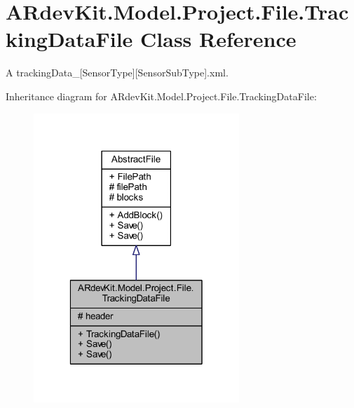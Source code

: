 \hypertarget{class_a_rdev_kit_1_1_model_1_1_project_1_1_file_1_1_tracking_data_file}{\section{A\-Rdev\-Kit.\-Model.\-Project.\-File.\-Tracking\-Data\-File Class Reference}
\label{class_a_rdev_kit_1_1_model_1_1_project_1_1_file_1_1_tracking_data_file}
}


A tracking\-Data\-\_\-\mbox{[}Sensor\-Type\mbox{]}\mbox{[}Sensor\-Sub\-Type\mbox{]}.xml.  




Inheritance diagram for A\-Rdev\-Kit.\-Model.\-Project.\-File.\-Tracking\-Data\-File\-:
\nopagebreak
\begin{figure}[H]
\begin{center}
\leavevmode
\includegraphics[width=220pt]{class_a_rdev_kit_1_1_model_1_1_project_1_1_file_1_1_tracking_data_file__inherit__graph}
\end{center}
\end{figure}



